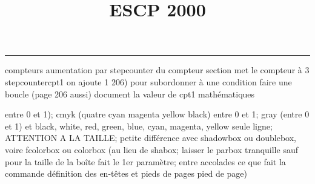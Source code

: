 \documentclass[11pt]{article}%
\title{\bf \vspace{-2cm} ESCP 2000} %
\author{} %
\date{} %
\renewcommand{\headrulewidth}{0pt}%
\renewcommand{\footrulewidth}{0.4pt}%
\begin{document}
\maketitle %
\vspace{-1.4cm}\hrule %
\thispagestyle{fancy}

\vspace*{.2cm}



compteurs%
aumentation par stepcounter du compteur section%
met le compteur à 3%
stepcounter{cpt1} on ajoute 1%
206) pour subordonner à une condition %
faire une boucle (page 206 aussi) %
document la valeur de cpt1 
mathématiques\newcommand{\ch}{\operatorname{ch}} 
\newcommand{\sh}{\operatorname{sh}}
\renewcommand{\tanh}{\operatorname{th}}
\renewcommand{\sinh}{\operatorname{sh}}
\renewcommand{\cosh}{\operatorname{ch}}
\newcommand{\argsh}{\operatorname{argsh}}
\newcommand{\argch}{\operatorname{argch}}
\newcommand{\argth}{\operatorname{argth}}
\newcommand{\ker}{\operatorname{Ker}}
\renewcommand{\im}{\operatorname{Im}}
\newcommand{\rg}{\operatorname{rg}}
\newcommand{\Id}{\operatorname{Id}}
\newcommand{\id}{\operatorname{id}}
\renewcommand{\leq}{\leq}
\renewcommand{\geq}{\geq }

entre 0 et 1); cmyk (quatre cyan magenta yellow black) entre 0 et 1;
gray (entre 0 et 1) et black, white, red, green, blue, cyan, magenta,
yellow%
seule ligne; ATTENTION A LA TAILLE; petite différence avec shadowbox ou
doublebox, voire fcolorbox ou colorbox (au lieu de shabox; laisser le
parbox tranquille sauf pour la taille de la boîte
\newcommand{\Tbox}[1]{\begin{center} \shabox{\parbox{0.6
\linewidth}{#1}} \end{center}} %
fait le 1er paramètre; entre accolades ce que fait la commande
définition des en-têtes et pieds de pages\pagestyle{fancy}
\chead{}
\rfoot[ \ \thepage]{\thepage}
\cfoot{}
\lfoot{}
\thispagestyle{fancy} %
pied de page)\renewcommand{\footrulewidth}{0.4pt}
\renewcommand{\headrulewidth}{0.4pt}
\end{document}
